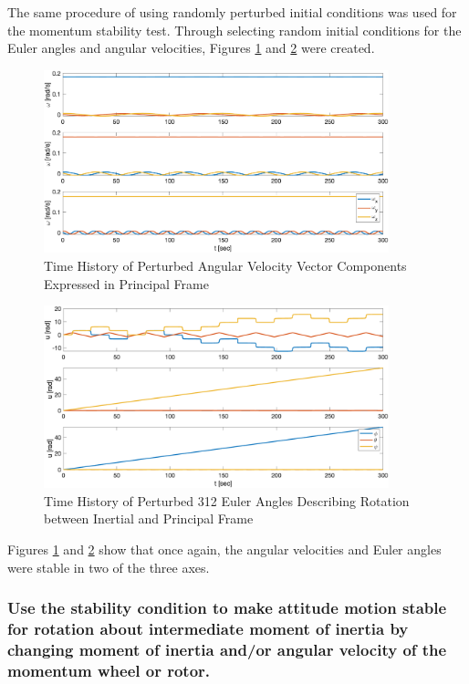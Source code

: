 The same procedure of using randomly perturbed initial conditions was used for the momentum stability test. Through selecting random initial conditions for the Euler angles and angular velocities, Figures \ref{fig:mom_wheel_stability_velocities} and \ref{fig:mom_wheel_stability_angles} were created.

\begin{figure}[H]
    \centering
    \captionsetup{ justification = centering}
    \includegraphics[width = 10cm]{Images/PS4/mom_wheel_stability_history_velocity.png}
    \caption{Time History of Perturbed Angular Velocity Vector Components Expressed in Principal Frame}
    \label{fig:mom_wheel_stability_velocities}
\end{figure}

\begin{figure}[H]
    \centering
    \captionsetup{justification = centering}
    \includegraphics[width = 10cm]{Images/PS4/mom_wheel_stability_history_angles.png}
    \caption{Time History of Perturbed 312 Euler Angles Describing Rotation between Inertial and Principal Frame}
    \label{fig:mom_wheel_stability_angles}
\end{figure}

Figures \ref{fig:mom_wheel_stability_velocities} and \ref{fig:mom_wheel_stability_angles} show that once again, the angular velocities and Euler angles were stable in two of the three axes. 

\subsubsection{Use the stability condition to make attitude motion stable for rotation about intermediate moment of inertia by changing moment of inertia and/or angular velocity of the momentum wheel or rotor.}

